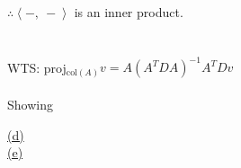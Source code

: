 \documentclass[12pt]{article}
\newcommand{\innerproduct}[2]{\left\langle #1, \ #2\right\rangle}
\begin{document}
\\\\
$\therefore \innerproduct{-}{-}$ is an inner product.
\\\\\\
WTS: proj$_{\text{col}(A)}v = A(A^TDA)^{-1}A^TDv$
\\\\
Showing 


\hyperlink{toc}{\hypertarget{5.4}{(d)}}\\

\hyperlink{toc}{\hypertarget{5.5}{(e)}}\\
\end{document}
